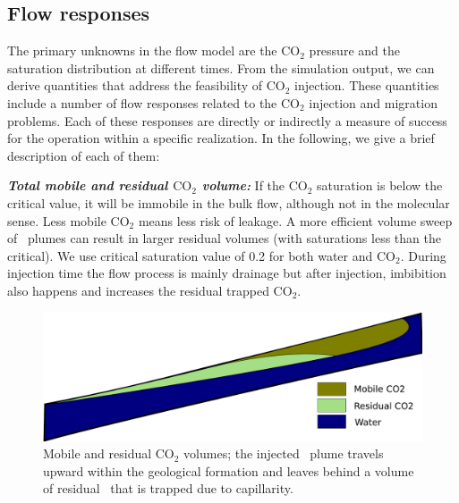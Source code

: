 \subsection{Flow responses}

The primary unknowns in the flow model are the $\mbox{CO}_2$ pressure
and the saturation distribution at different times. From the simulation
output, we can derive quantities that
address the feasibility of $\mbox{CO}_2$ injection.
These quantities include a number of flow responses related to the $\mbox{CO}_2$
injection and migration problems. Each of these responses are directly or
indirectly a measure of success for the operation within a specific realization.
In the following, we give a brief description of each of them:


\textbf{\textit{Total mobile and residual $\mbox{CO}_2$ volume:}}
If the CO$_2$ saturation is below the critical value, it will be immobile in the
bulk flow, although not in the molecular sense. Less mobile CO$_2$ means less
risk of leakage. A more efficient volume sweep  of \coo\ plumes can result in larger residual volumes (with saturations less than the
critical). We use
critical saturation value of 0.2 for both water and CO$_2$. During injection time the
flow process is mainly drainage but after injection, imbibition also happens and
increases the residual trapped CO$_2$. 

\begin{figure}[thb]
  \centering
  \includegraphics[width=0.65 \linewidth]{./figurer/MobRes} 
  \caption{Mobile and residual CO$_2$ volumes; the injected \coo\ plume travels upward within the geological formation and leaves behind a volume of residual \coo\ that is trapped due to capillarity.}
  \label{fig:MobRes}
%
\end{figure}

